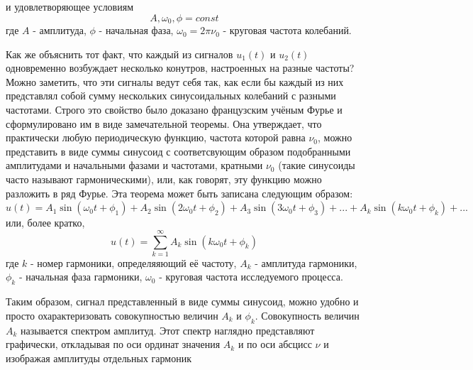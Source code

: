 \documentclass[main.tex]{subfiles}
\begin{document}
\begin{multicols}{2}
\noindent и удовлетворяющее условиям \[ A, \omega_0, \phi = const \] где $A$ - амплитуда, $\phi$ - начальная фаза, $\omega_0 = 2\pi\nu_0$ - круговая частота колебаний. \par Как же объяснить тот факт, что каждый из сигналов $u_1(t)$ и $u_2(t)$ одновременно возбуждает несколько конутров, настроенных на разные частоты? Можно заметить, что эти  сигналы ведут себя так, как если бы каждый из них представлял собой сумму нескольких синусоидальных колебаний с разными частотами. Строго это свойство было доказано французским учёным Фурье и сформулировано им в виде замечательной теоремы. Она утверждает, что практически любую периодическую функцию, частота которой равна $\nu_0$, можно представить в виде суммы синусоид с соответсвующим образом подобранными амплитудами и начальными фазами и частотами, кратными $\nu_0$ (такие синусоиды часто называют гармоническими), или, как говорят, эту функцию можно разложить в ряд Фурье. Эта теорема может быть записана следующим образом:\\
$ u(t) = A_1\sin({\omega_0t + \phi_1})  + A_2\sin({2\omega_0t + \phi_2}) + A_3\sin({3\omega_0t + \phi_3}) + ... + A_k\sin({k\omega_0t + \phi_k}) + ...$\\

или, более кратко, \[u(t) = \sum_{k=1}^{\infty}A_k\sin({k\omega_0t + \phi_k})\] где $k$ - номер гармоники, определяяющий её частоту, $A_k$ - амплитуда гармоники, $\phi_k$ - начальная фаза гармоники, $\omega_0$ - круговая частота исследуемого процесса. \par Таким образом, сигнал представленный в виде суммы синусоид, можно удобно и просто охарактеризовать совокупностью величин $A_k$ и $\phi_k$. Совокупность величин $A_k$ называется спектром амплитуд. Этот спектр наглядно представляют графически, откладывая по оси ординат значения $A_k$ и по оси абсцисс $\nu$ и изображая амплитуды отдельных гармоник

\end{multicols}
\end{document}
